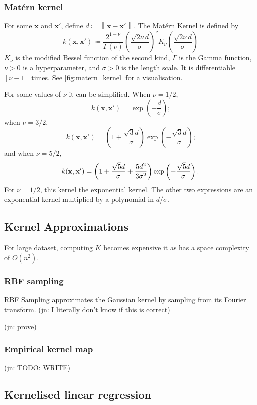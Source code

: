 \documentclass[11pt,twoside,openright]{report}
\newcommand\bx{\mathbf{x}}
\newcommand\norm[1]{\left\|#1\right\|}
\newcommand\floor[1]{\left\lfloor#1\right\rfloor}
\newcommand\jn[1]{{\color{red}(jn: #1)}}
\begin{document}
\subsubsection{Mat\'ern kernel}

For some $\bx$ and $\bx'$, define $d \coloneqq \norm{\bx - \bx'}$. The Mat\'ern Kernel is defined by \[
    k(\bx, \bx') \coloneqq \frac{2^{1-\nu}}{\Gamma(\nu)}\left(\frac{\sqrt{2\nu}d}{\sigma}\right)^\nu K_\nu\left(\frac{\sqrt{2\nu}d}{\sigma}\right)
\]$K_\nu$ is the modified Bessel function of the second kind, $\Gamma$ is the Gamma function, $\nu > 0$ is a hyperparameter, and $\sigma > 0$ is the length scale. It is differentiable $\floor{\nu-1}$ times. See \cref{fig:matern_kernel} for a visualisation.

For some values of $\nu$ it can be simplified. When $\nu = 1/2$,
 \[
   k(\bx, \bx') = \exp\left(-\frac{d}{\sigma}\right) \text{;}
 \] when $\nu=3/2$, \[
   k(\bx, \bx') = \left(1 + \frac{\sqrt{3}d}{\sigma}\right)\exp\left(-\frac{\sqrt{3}d}{\sigma}\right) \text{;}
 \] and when $\nu = 5/2$,\[
  k(\bx, \bx') = \left(1 + \frac{\sqrt{5}d}{\sigma} + \frac{5d^2}{3\sigma^2}\right)\exp\left(-\frac{\sqrt{5}d}{\sigma}\right) \text.
 \] For $\nu=1/2$, this kernel the exponential kernel. The other two expressions are an exponential kernel multiplied by a polynomial in $d/\sigma$.

\subsection{Kernel Approximations}

For large dataset, computing $K$ becomes expensive it as has a space complexity of $O(n^2)$.

\subsubsection{RBF sampling}

RBF Sampling approximates the Gaussian kernel by sampling from its Fourier transform. \jn{I literally don't know if this is correct}

\jn{prove}

\subsubsection{Empirical kernel map}

\jn{TODO: WRITE}


\subsection{Kernelised linear regression}
\end{document}
